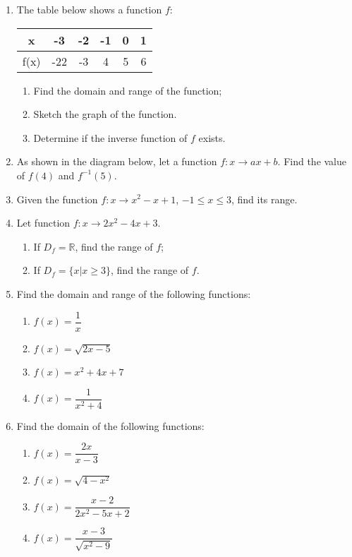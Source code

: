 \documentclass[12pt]{report}
\begin{document}
\begin{multicols}{2}
\begin{enumerate}
    \item The table below shows a function $f$:
          \begin{center}
            \begin{tabular}{|c|c|c|c|c|c|}
              \hline
              x    & -3  & -2 & -1 & 0 & 1 \\
              \hline
              f(x) & -22 & -3 & 4  & 5 & 6 \\
              \hline
            \end{tabular}
          \end{center}
          \begin{enumerate}
            \item Find the domain and range of the function;
            \item Sketch the graph of the function.
            \item Determine if the inverse function of $f$ exists.
          \end{enumerate}

    \item As shown in the diagram below, let a function $f: x \to ax + b$. Find the value
          of $f(4)$ and $f^{-1}(5)$.

    \item Given the function $f:x \to x^2 - x + 1$, $-1 \leq x \leq 3$, find its range.

    \item Let function $f:x \to 2x^2 - 4x + 3$.
          \begin{enumerate}
            \item If $D_f = \mathbb{R}$, find the range of $f$;
            \item If $D_f = \big\{x | x \geq 3\big\}$, find the range of $f$.
          \end{enumerate}

    \item Find the domain and range of the following functions:
          \begin{enumerate}
            \item $f(x) = \dfrac{1}{x}$
            \item $f(x) = \sqrt{2x - 5}$
            \item $f(x) = x^2 + 4x + 7$
            \item $f(x) = \dfrac{1}{x^2 + 4}$
          \end{enumerate}

    \item Find the domain of the following functions:
          \begin{enumerate}
            \item $f(x) = \dfrac{2x}{x-3}$
            \item $f(x) = \sqrt{4 - x^2}$
            \item $f(x) = \dfrac{x-2}{2x^2 - 5x + 2}$
            \item $f(x) = \dfrac{x-3}{\sqrt{x^2 - 9}}$
          \end{enumerate}


\end{enumerate}
\end{multicols}
\end{document}

